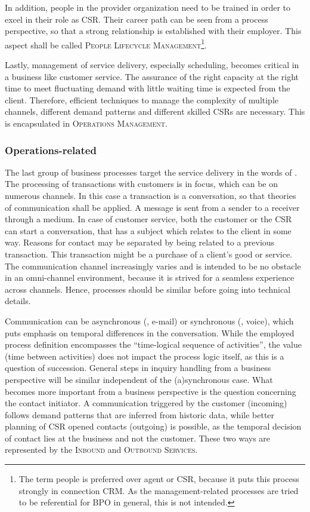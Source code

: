 	In addition, people in the provider organization need to be trained in order to excel in their role as \acrshort{CSR}. Their career path can be seen from a process perspective, so that a strong relationship is established with their employer. This aspect shall be called \textsc{People Lifecycle Management}\footnote{The term people is preferred over agent or \acrshort{CSR}, because it puts this process strongly in connection \acrshort{CRM}. As the management-related processes are tried to be referential for \acrshort{BPO} in general, this is not intended.}. 
	
	Lastly, management of service delivery, especially scheduling, becomes critical in a business like customer service. The assurance of the right capacity at the right time to meet fluctuating demand with little waiting time is expected from the client. Therefore, efficient techniques to manage the complexity of multiple channels, different demand patterns and different skilled \acrshort{CSR}s are necessary. This is encapsulated in  \textsc{Operations Management}. 
	
	\subsubsection{Operations-related}
	The last group of business processes target the service delivery in the words of \citeauthor{schewe2007}. The processing of transactions with customers is in focus, which can be on numerous channels. In this case a transaction is a conversation, so that theories of communication \citep{shannon1949} shall be applied. A message is sent from a sender to a receiver through a medium. In case of customer service, both the customer or the \acrshort{CSR} can start a conversation, that has a subject which relates to the client in some way. Reasons for contact may be separated by being related to a previous transaction. This transaction might be a purchase of a client's good or service. The communication channel increasingly varies and is intended to be no obstacle in an omni-channel environment, because it is strived for a seamless experience across channels. Hence, processes should be similar before going into technical details. 
	
	Communication can be asynchronous (\eg, e-mail) or synchronous (\eg, voice), which puts emphasis on temporal differences in the conversation. While the employed process definition encompasses the \enquote{time-logical sequence of activities}, the value (\viz time between activities) does not impact the process logic itself, as this is a question of succession. General steps in inquiry handling from a business perspective will be similar independent of the (a)synchronous case. What becomes more important from a business perspective is the question concerning the contact initiator. A communication triggered by the customer (incoming) follows demand patterns that are inferred from historic data, while better planning of \acrshort{CSR} opened contacts (outgoing) is possible, as the temporal decision of contact lies at the business and not the customer. These two ways are represented by the \textsc{Inbound} and \textsc{Outbound Services}.
	
